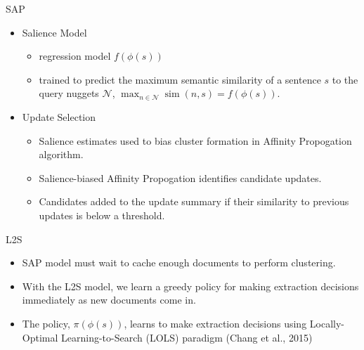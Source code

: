 \begin{frame}{SAP}

    \begin{itemize}
        \item Salience Model 
    \begin{itemize}
        \item regression model $f(\phi(s))$
        \item trained to predict the maximum semantic similarity of 
            a sentence $s$ to the query nuggets $\mathcal{N}$,
        $\max_{n \in \mathcal{N}} \operatorname{sim}(n, s) = f(\phi(s))$.



    \end{itemize}
    \vspace{10pt}
\item Update Selection
    \begin{itemize}
        \item Salience estimates used to bias cluster formation in 
            Affinity Propogation algorithm.
        \item Salience-biased Affinity Propogation identifies candidate updates.
        \item Candidates added to the update summary if their similarity to
            previous updates is below a threshold.
    \end{itemize}

    \end{itemize}

\end{frame}

\begin{frame}{L2S}

    \begin{itemize}
        \item SAP model must wait to cache enough documents to perform clustering.
            \vspace{10pt}
        \item With the L2S model, we learn a greedy policy for making extraction decisions immediately as new documents come in.
            \vspace{10pt}
        \item The policy, $\pi(\phi(s))$, learns to make extraction decisions using Locally-Optimal Learning-to-Search (LOLS) paradigm (Chang et al., 2015)

    \end{itemize}

\end{frame}

